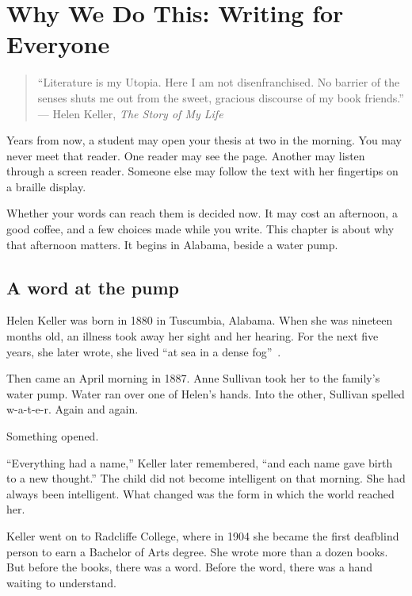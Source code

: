 \chapter{Why We Do This: Writing for Everyone}
\label{chap:why}

\begin{quote}
\enquote{Literature is my Utopia. Here I am not disenfranchised. No
barrier of the senses shuts me out from the sweet, gracious discourse
of my book friends.}
--- Helen Keller, \emph{The Story of My Life}~\autocite{keller1903}
\end{quote}

Years from now, a student may open your thesis at two in the morning.
You may never meet that reader. One reader may see the page. Another may listen through a screen reader. Someone else may follow the text with her fingertips on a braille display.

Whether your words can reach them is decided now. It may cost an
afternoon, a good coffee, and a few choices made while you write. This
chapter is about why that afternoon matters. It begins in Alabama,
beside a water pump.

\section{A word at the pump}
\label{sec:keller}

Helen Keller was born in 1880 in Tuscumbia, Alabama. When she was
nineteen months old, an illness took away her sight and her hearing.
For the next five years, she later wrote, she lived \enquote{at sea in
a dense fog}~\autocite{keller1903}.

Then came an April morning in 1887. Anne Sullivan took her to the
family's water pump. Water ran over one of Helen's hands. Into the
other, Sullivan spelled \mbox{w-a-t-e-r}. Again and again.

Something opened.

\enquote{Everything had a name,} Keller later remembered, \enquote{and
each name gave birth to a new thought.} The child did not become
intelligent on that morning. She had always been intelligent. What changed was the form in which the world reached her.

Keller went on to Radcliffe College, where in 1904 she became the first
deafblind person to earn a Bachelor of Arts degree. She wrote more than
a dozen books. But before the books, there was a word. Before the word,
there was a hand waiting to understand.

